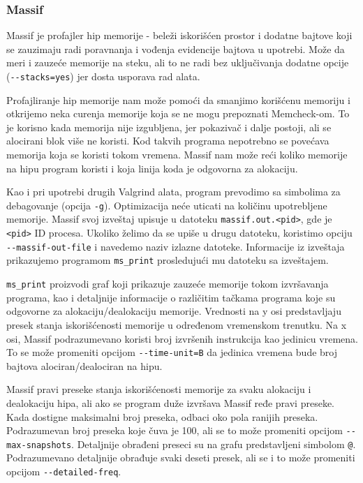 \subsubsection{Massif}\label{massif}

Massif je profajler hip memorije - beleži iskorišćen prostor i dodatne bajtove koji se zauzimaju radi poravnanja i vođenja evidencije bajtova u upotrebi. Može da meri i zauzeće memorije na steku, ali to ne radi bez uključivanja dodatne opcije (\texttt{-\/-stacks=yes}) jer dosta usporava rad alata.

Profajliranje hip memorije nam može pomoći da smanjimo korišćenu memoriju i otkrijemo neka curenja memorije koja se ne mogu prepoznati Memcheck-om. To je korisno kada memorija nije izgubljena, jer pokazivač i dalje postoji, ali se alocirani blok više ne koristi. Kod takvih programa nepotrebno se povećava memorija koja se koristi tokom vremena. Massif nam može reći koliko memorije na hipu program koristi i koja linija koda je odgovorna za alokaciju.

Kao i pri upotrebi drugih Valgrind alata, program prevodimo sa simbolima za debagovanje (opcija \texttt{-g}). Optimizacija neće uticati na količinu upotrebljene memorije. Massif svoj izveštaj upisuje u datoteku \texttt{massif.out.\textless{}pid\textgreater{}}, gde je \texttt{\textless{}pid\textgreater{}} ID procesa. Ukoliko želimo da se upiše u drugu datoteku, koristimo opciju \texttt{-\/-massif-out-file} i navedemo naziv izlazne datoteke. Informacije iz izveštaja prikazujemo programom \texttt{ms\_print} prosledujući mu datoteku sa izveštajem.

\texttt{ms\_print} proizvodi graf koji prikazuje zauzeće memorije tokom izvršavanja programa, kao i detaljnije informacije o različitim tačkama programa koje su odgovorne za alokaciju/dealokaciju memorije. Vrednosti na y osi predstavljaju presek stanja iskorišćenosti memorije u određenom vremenskom trenutku. Na x osi, Massif podrazumevano koristi broj izvršenih instrukcija kao jedinicu vremena. To se može promeniti opcijom \texttt{-\/-time-unit=B} da jedinica vremena bude broj bajtova alociran/dealociran na hipu.

Massif pravi preseke stanja iskorišćenosti memorije za svaku alokaciju i dealokaciju hipa, ali ako se program duže izvršava Massif ređe pravi preseke. Kada dostigne maksimalni broj preseka, odbaci oko pola ranijih preseka. Podrazumevan broj preseka koje čuva je 100, ali se to može promeniti opcijom \texttt{-\/-max-snapshots}. Detaljnije obrađeni preseci su na grafu predstavljeni simbolom \texttt{@}. Podrazumevano detaljnije obrađuje svaki deseti presek, ali se i to može promeniti opcijom \texttt{-\/-detailed-freq}.

